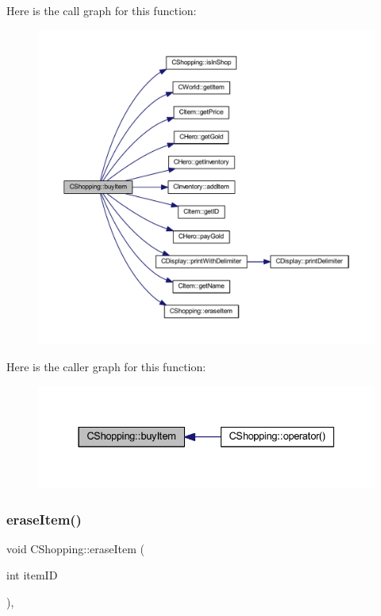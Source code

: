 Here is the call graph for this function\+:\nopagebreak
\begin{figure}[H]
\begin{center}
\leavevmode
\includegraphics[width=350pt]{class_c_shopping_a0981a7916cca8a37beb35858ad2ec77e_cgraph}
\end{center}
\end{figure}
Here is the caller graph for this function\+:\nopagebreak
\begin{figure}[H]
\begin{center}
\leavevmode
\includegraphics[width=331pt]{class_c_shopping_a0981a7916cca8a37beb35858ad2ec77e_icgraph}
\end{center}
\end{figure}
\mbox{\label{class_c_shopping_a83cfae0f7001775fc1d5a5dc097b3e96}} 
\subsubsection{\texorpdfstring{erase\+Item()}{eraseItem()}}
{\footnotesize\ttfamily void C\+Shopping\+::erase\+Item (\begin{DoxyParamCaption}\item[{int}]{item\+ID }\end{DoxyParamCaption})\hspace{0.3cm}{\ttfamily [inline]}, {\ttfamily [protected]}}

